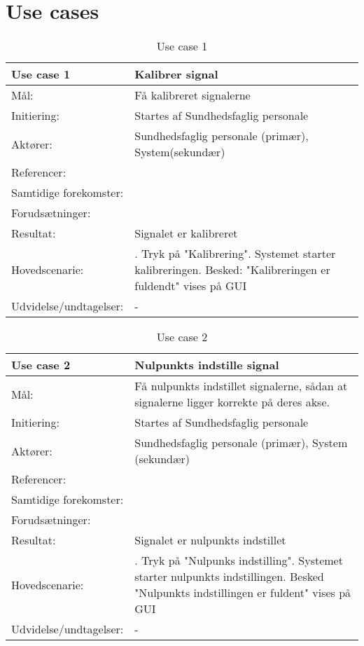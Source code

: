 \section{Use cases}
\begin{table}[h!]
\caption{Use case 1}\label{tab:tabel3}
\begin{tabular}{| l | >{\raggedright\arraybackslash}p{11cm} |}
   \hline
   \textbf{Use case 1} & \textbf{Kalibrer signal}\\ \hline
   Mål: & Få kalibreret signalerne \\ \hline
   Initiering: & Startes af Sundhedsfaglig personale\\ \hline
   Aktører:& Sundhedsfaglig personale (primær), System(sekundær)\\ \hline
   Referencer: & \\ \hline
   Samtidige forekomster: & \\\hline
   Forudsætninger: & \\ \hline
   Resultat:& Signalet er kalibreret\\ \hline
   Hovedscenarie:& 
1. Tryk på "Kalibrering"\newline
2. Systemet starter kalibreringen\newline
3. Besked: "Kalibreringen er fuldendt" vises på GUI\\\hline
Udvidelse/undtagelser: & -\\\hline
\end{tabular}
\end{table}

\begin{table}[h!]
\caption{Use case 2}\label{tab:tabel3}
\begin{tabular}{| l | >{\raggedright\arraybackslash}p{11cm} |}
   \hline
   \textbf{Use case 2} & \textbf{Nulpunkts indstille signal}\\ \hline
   Mål: & Få nulpunkts indstillet signalerne, sådan at signalerne ligger korrekte på deres akse. \\ \hline
   Initiering: & Startes af Sundhedsfaglig personale\\ \hline
   Aktører:& Sundhedsfaglig personale (primær), System (sekundær)\\ \hline
   Referencer: & \\ \hline
   Samtidige forekomster: & \\\hline
   Forudsætninger: & \\ \hline
   Resultat:& Signalet er nulpunkts indstillet\\ \hline
   Hovedscenarie:& 
1. Tryk på "Nulpunks indstilling"\newline
2. Systemet starter nulpunkts indstillingen\newline
3. Besked "Nulpunkts indstillingen er fuldent" vises på GUI\\\hline
Udvidelse/undtagelser: & -\\\hline
\end{tabular}
\end{table}

